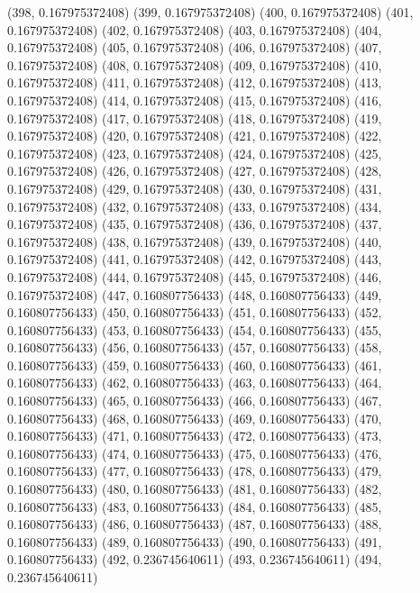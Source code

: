 {					(398, 0.167975372408)
					(399, 0.167975372408)
					(400, 0.167975372408)
					(401, 0.167975372408)
					(402, 0.167975372408)
					(403, 0.167975372408)
					(404, 0.167975372408)
					(405, 0.167975372408)
					(406, 0.167975372408)
					(407, 0.167975372408)
					(408, 0.167975372408)
					(409, 0.167975372408)
					(410, 0.167975372408)
					(411, 0.167975372408)
					(412, 0.167975372408)
					(413, 0.167975372408)
					(414, 0.167975372408)
					(415, 0.167975372408)
					(416, 0.167975372408)
					(417, 0.167975372408)
					(418, 0.167975372408)
					(419, 0.167975372408)
					(420, 0.167975372408)
					(421, 0.167975372408)
					(422, 0.167975372408)
					(423, 0.167975372408)
					(424, 0.167975372408)
					(425, 0.167975372408)
					(426, 0.167975372408)
					(427, 0.167975372408)
					(428, 0.167975372408)
					(429, 0.167975372408)
					(430, 0.167975372408)
					(431, 0.167975372408)
					(432, 0.167975372408)
					(433, 0.167975372408)
					(434, 0.167975372408)
					(435, 0.167975372408)
					(436, 0.167975372408)
					(437, 0.167975372408)
					(438, 0.167975372408)
					(439, 0.167975372408)
					(440, 0.167975372408)
					(441, 0.167975372408)
					(442, 0.167975372408)
					(443, 0.167975372408)
					(444, 0.167975372408)
					(445, 0.167975372408)
					(446, 0.167975372408)
					(447, 0.160807756433)
					(448, 0.160807756433)
					(449, 0.160807756433)
					(450, 0.160807756433)
					(451, 0.160807756433)
					(452, 0.160807756433)
					(453, 0.160807756433)
					(454, 0.160807756433)
					(455, 0.160807756433)
					(456, 0.160807756433)
					(457, 0.160807756433)
					(458, 0.160807756433)
					(459, 0.160807756433)
					(460, 0.160807756433)
					(461, 0.160807756433)
					(462, 0.160807756433)
					(463, 0.160807756433)
					(464, 0.160807756433)
					(465, 0.160807756433)
					(466, 0.160807756433)
					(467, 0.160807756433)
					(468, 0.160807756433)
					(469, 0.160807756433)
					(470, 0.160807756433)
					(471, 0.160807756433)
					(472, 0.160807756433)
					(473, 0.160807756433)
					(474, 0.160807756433)
					(475, 0.160807756433)
					(476, 0.160807756433)
					(477, 0.160807756433)
					(478, 0.160807756433)
					(479, 0.160807756433)
					(480, 0.160807756433)
					(481, 0.160807756433)
					(482, 0.160807756433)
					(483, 0.160807756433)
					(484, 0.160807756433)
					(485, 0.160807756433)
					(486, 0.160807756433)
					(487, 0.160807756433)
					(488, 0.160807756433)
					(489, 0.160807756433)
					(490, 0.160807756433)
					(491, 0.160807756433)
					(492, 0.236745640611)
					(493, 0.236745640611)
					(494, 0.236745640611)
}
